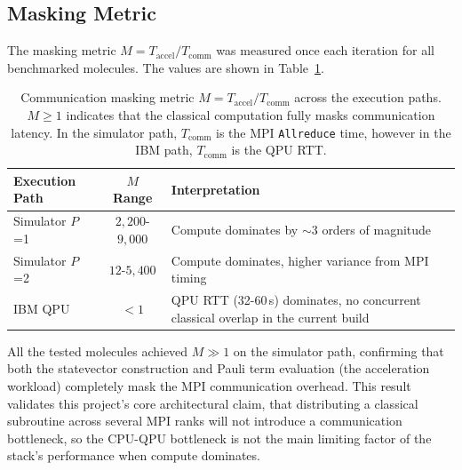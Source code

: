 \subsection{Masking Metric}
The masking metric $M = T_{\text{accel}} / T_{\text{comm}}$  was measured once each iteration for all benchmarked molecules. The values are shown in Table~\ref{table:masking}.

\begin{table}[htbp]
\centering
\renewcommand{\arraystretch}{1.2}
\caption{Communication masking metric $M = T_{\text{accel}} / T_{\text{comm}}$ across the execution paths. $M \geq 1$ indicates that the classical computation fully masks communication latency. In the simulator path, $T_{\text{comm}}$ is the MPI \texttt{Allreduce} time, however in the IBM path, $T_{\text{comm}}$ is the QPU RTT.}
\label{table:masking}
\begin{tabular}{|l|c|>{\raggedright\arraybackslash}p{6cm}|}
\hline
\textbf{Execution Path} & \textbf{$M$ Range} & \textbf{Interpretation} \\ \hline
Simulator $P$=1 & $2{,}200$-$9{,}000$  & Compute dominates by $\sim 3$ orders of magnitude  \\ \hline
Simulator $P$=2 & $12$-$5{,}400$  & Compute dominates, higher variance from MPI timing  \\ \hline
IBM QPU & $<1$ & QPU RTT (32-60\,s) dominates, no concurrent classical overlap in the current build \\ \hline
\end{tabular}
\end{table}

All the tested molecules achieved $M \gg 1$ on the simulator path, confirming that both the statevector construction and Pauli term evaluation 
(the acceleration workload) completely mask the MPI communication overhead. This result validates this project's core 
architectural claim, that distributing a classical subroutine across several MPI ranks will not introduce a communication 
bottleneck, so the CPU-QPU bottleneck \parencite{cruise2020practicalquantumcomputingvalue} is not the main limiting factor of the stack's performance when compute dominates.

